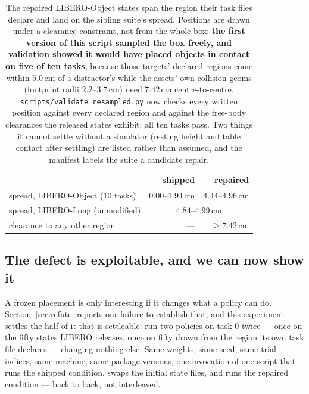 \documentclass[10pt,twocolumn]{article}
\begin{document}
\begin{table}[h]\centering\footnotesize
\setlength{\tabcolsep}{5pt}
\begin{tabular}{lrr}
\toprule
& shipped & repaired \\
\midrule
spread, LIBERO-Object (10 tasks) & $0.00$--$1.94$\,cm & $4.44$--$4.96$\,cm \\
spread, LIBERO-Long (unmodified) & \multicolumn{2}{c}{$4.84$--$4.99$\,cm} \\
clearance to any other region & --- & $\ge 7.42$\,cm \\
\bottomrule
\end{tabular}
\caption{The repaired LIBERO-Object states span the region their task files
declare and land on the sibling suite's spread. Positions are drawn under a
clearance constraint, not from the whole box: \textbf{the first version of this
script sampled the box freely, and validation showed it would have placed
objects in contact on five of ten tasks}, because those targets' declared
regions come within $5.0$\,cm of a distractor's while the assets' own collision
geoms (footprint radii $2.2$--$3.7$\,cm) need $7.42$\,cm centre-to-centre.
\texttt{scripts/validate\_resampled.py} now checks every written position
against every declared region and against the free-body clearances the
released states exhibit; all ten tasks pass. Two things it cannot settle without a
simulator (resting height and table contact after settling) are listed
rather than assumed, and the manifest labels the suite a candidate repair.}
\label{tab:repaired}
\end{table}

\subsection{The defect is exploitable, and we can now show it}
\label{sec:e1}

A frozen placement is only interesting if it changes what a policy can do.
Section~\ref{sec:refute} reports our failure to establish that, and this
experiment settles the half of it that is settleable: run two policies on task
$0$ twice --- once on the fifty states LIBERO releases, once on fifty drawn from
the region its own task file declares --- changing nothing else. Same weights,
same seed, same trial indices, same machine, same package versions, one
invocation of one script that runs the shipped condition, swaps the initial
state files, and runs the repaired condition --- back to back, not
interleaved.
\end{document}
